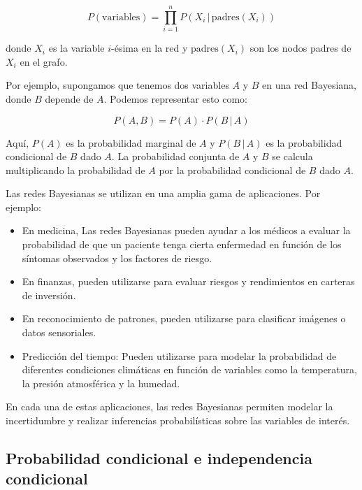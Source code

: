 \[
P(\text{{variables}}) = \prod_{i=1}^{n} P(X_i \,|\, \text{{padres}}(X_i))
\]

donde \( X_i \) es la variable \( i \)-ésima en la red y \( \text{{padres}}(X_i) \) son los nodos padres de \( X_i \) en el grafo.

Por ejemplo, supongamos que tenemos dos variables \( A \) y \( B \) en una red Bayesiana, donde \( B \) depende de \( A \). Podemos representar esto como:

\[
P(A, B) = P(A) \cdot P(B \,|\, A)
\]

Aquí, \( P(A) \) es la probabilidad marginal de \( A \) y \( P(B \,|\, A) \) es la probabilidad condicional de \( B \) dado \( A \). La probabilidad conjunta de \( A \) y \( B \) se calcula multiplicando la probabilidad de \( A \) por la probabilidad condicional de \( B \) dado \( A \).

Las redes Bayesianas se utilizan en una amplia gama de aplicaciones. Por ejemplo:

\begin{itemize}
    \item  En medicina, Las redes Bayesianas pueden ayudar a los médicos a evaluar la probabilidad de que un paciente tenga cierta enfermedad en función de los síntomas observados y los factores de riesgo.
    \item En finanzas, pueden utilizarse para evaluar riesgos y rendimientos en carteras de inversión.
    \item En reconocimiento de patrones, pueden utilizarse para clasificar imágenes o datos sensoriales.

    \item Predicción del tiempo: Pueden utilizarse para modelar la probabilidad de diferentes condiciones climáticas en función de variables como la temperatura, la presión atmosférica y la humedad.

\end{itemize}
En cada una de estas aplicaciones, las redes Bayesianas permiten modelar la incertidumbre y realizar inferencias probabilísticas sobre las variables de interés.

\subsection*{Probabilidad condicional e independencia condicional}

